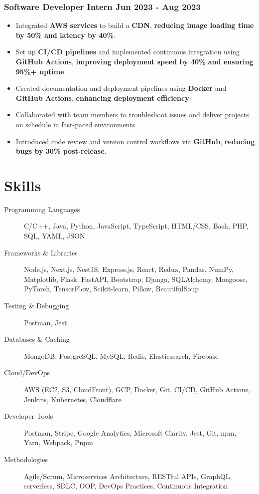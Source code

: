 \documentclass[10pt]{article}
\newcommand{\rside}[1]{
  \hfill {\small\color{accent} #1}%
}
\begin{document}
\subsubsection{Software Developer Intern \rside{Jun 2023 - Aug 2023}}
\begin{itemize}
  \item Integrated \textbf{AWS services} to build a \textbf{CDN}, \textbf{reducing image loading time by 50\% and latency by 40\%}.
  \item Set up \textbf{CI/CD pipelines} and implemented continuous integration using \textbf{GitHub Actions}, \textbf{improving deployment speed by 40\% and ensuring 95\%+ uptime}.
  \item Created documentation and deployment pipelines using \textbf{Docker} and \textbf{GitHub Actions}, \textbf{enhancing deployment efficiency}.
  \item Collaborated with team members to troubleshoot issues and deliver projects on schedule in fast-paced environments.
  \item Introduced code review and version control workflows via \textbf{GitHub}, \textbf{reducing bugs by 30\% post-release}.
\end{itemize}

\section{Skills}
\begin{description}
  \item[Programming Languages] C/C++, Java, Python, JavaScript, TypeScript, HTML/CSS, Bash, PHP, SQL, YAML, JSON
  \item[Frameworks \& Libraries] Node.js, Next.js, NestJS, Express.js, React, Redux, Pandas, NumPy, Matplotlib, Flask, FastAPI, Bootstrap, Django, SQLAlchemy, Mongoose, PyTorch, TensorFlow, Scikit-learn, Pillow, BeautifulSoup 
  \item[Testing \& Debugging] Postman, Jest
  \item[Databases \& Caching] MongoDB, PostgreSQL, MySQL, Redis, Elasticsearch, Firebase
  \item[Cloud/DevOps] AWS (EC2, S3, CloudFront), GCP, Docker, Git, CI/CD, GitHub Actions, Jenkins, Kubernetes, Cloudflare
  \item[Developer Tools] Postman, Stripe, Google Analytics, Microsoft Clarity, Jest, Git, npm, Yarn, Webpack, Pnpm
  \item[Methodologies] Agile/Scrum, Microservices Architecture, RESTful APIs, GraphQL, serverless, SDLC, OOP, DevOps Practices, Continuous Integration
\end{description}
\end{document}
